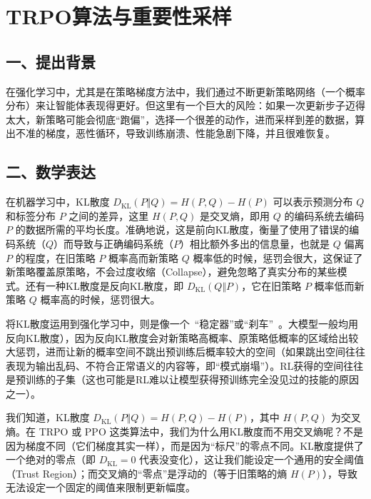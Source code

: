 \setcounter{section}{1}

\hypertarget{trpoux7b97ux6cd5ux4e0eux91cdux8981ux6027ux91c7ux6837}{%
\section{TRPO算法与重要性采样}\label{trpoux7b97ux6cd5ux4e0eux91cdux8981ux6027ux91c7ux6837}}

\hypertarget{ux4e00ux63d0ux51faux80ccux666f}{%
\subsection{一、提出背景}\label{ux4e00ux63d0ux51faux80ccux666f}}

在强化学习中，尤其是在策略梯度方法中，我们通过不断更新策略网络（一个概率分布）来让智能体表现得更好。但这里有一个巨大的风险：如果一次更新步子迈得太大，新策略可能会彻底``跑偏''，选择一个很差的动作，进而采样到差的数据，算出不准的梯度，恶性循环，导致训练崩溃、性能急剧下降，并且很难恢复。

\hypertarget{ux4e8cux6570ux5b66ux8868ux8fbe-1}{%
\subsection{二、数学表达}\label{ux4e8cux6570ux5b66ux8868ux8fbe-1}}

在机器学习中，KL散度 \(D_{\mathrm{KL}}(P\Vert Q)=H(P,Q)-H(P)\) 可以表示预测分布 \(Q\) 和标签分布 \(P\) 之间的差异，这里 \(H(P,Q)\) 是交叉熵，即用 \(Q\) 的编码系统去编码 \(P\) 的数据所需的平均长度。准确地说，这是前向KL散度，衡量了使用了错误的编码系统（\(Q\)）而导致与正确编码系统（\(P\)）相比额外多出的信息量，也就是 \(Q\) 偏离 \(P\) 的程度，在旧策略 \(P\) 概率高而新策略 \(Q\) 概率低的时候，惩罚会很大，这保证了新策略覆盖原策略，不会过度收缩（Collapse），避免忽略了真实分布的某些模式。还有一种KL散度是反向KL散度，即 \(D_{\mathrm{KL}}(Q\Vert P)\)，它在旧策略 \(P\) 概率低而新策略 \(Q\) 概率高的时候，惩罚很大。

将KL散度运用到强化学习中，则是像一个~``稳定器''或``刹车''~。大模型一般均用反向KL散度），因为反向KL散度会对新策略高概率、原策略低概率的区域给出较大惩罚，进而让新的概率空间不跳出预训练后概率较大的空间（如果跳出空间往往表现为输出乱码、不符合正常语义的内容等，即``模式崩塌''）。RL获得的空间往往是预训练的子集（这也可能是RL难以让模型获得预训练完全没见过的技能的原因之一）。

我们知道，KL散度 \(D_{\mathrm{KL}}(P\Vert Q)=H(P,Q)-H(P)\)，其中 \(H(P,Q)\) 为交叉熵。在 TRPO 或 PPO 这类算法中，我们为什么用KL散度而不用交叉熵呢？不是因为梯度不同（它们梯度其实一样），而是因为``标尺''的零点不同。KL散度提供了一个绝对的零点（即 \(D_{\mathrm{KL}}=0\) 代表没变化），这让我们能设定一个通用的安全阈值（Trust Region）；而交叉熵的``零点''是浮动的（等于旧策略的熵 \(H(P)\)），导致无法设定一个固定的阈值来限制更新幅度。

